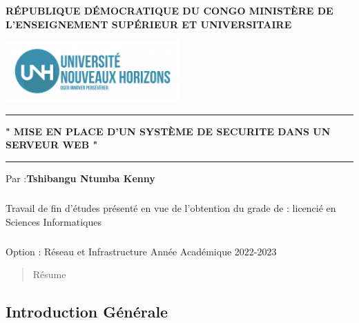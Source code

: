 

	\author{Tshibangu Ntumba Kenny}
	
	\begin{titlepage}
		
		 \centering
		
		\textbf{\Large RÉPUBLIQUE DÉMOCRATIQUE DU CONGO
			MINISTÈRE DE L’ENSEIGNEMENT SUPÉRIEUR ET UNIVERSITAIRE}
		\vspace{1.5cm}
		 
		 \includegraphics[width=0.5\textwidth]{PhotoMemoire/Logo.jpg}
		 \vspace{3.5cm}
		 
		 \hrule
		 \vspace{0.6cm}
		 \textbf{\Large "  MISE EN PLACE D'UN SYSTÈME DE SECURITE DANS UN SERVEUR WEB "}
		 \vspace{0.6cm}
		 \hrule
		 \vspace{2.5cm}
		 
		  \large Par :\textbf{Tshibangu Ntumba Kenny} 
		  
		  \paragraph{ } Travail de fin d’études présenté en vue de l’obtention
		  du grade de : licencié en Sciences Informatiques
		\paragraph{ } \Large{ Option : Réseau et Infrastructure}
		 \vfill
		 {\LARGE Année Académique 2022-2023}
		 \centering
	\end{titlepage}
\begin{center}
\tableofcontents
\pagebreak
\end{center}
\begin{center}
	\listoffigures
	\pagebreak 
\end{center}
	    \begin{abstract}
	    	 Résume
	    \end{abstract}
    
	\begin{Huge}
		\chapter{ Introduction Générale}
 
	\end{Huge}
 
